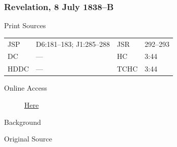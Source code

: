 		\subsubsection{Revelation, 8 July 1838--B}
			\label{EMS-1838-JS-8-JUL-1838-B}
			
			\begin{description}
					\item[Print Sources]
				\end{description}

					\begin{tabular}{p{0.5in}p{1in}p{0.5in}p{1in}}
					JSP	 	& D6:181--183; J1:285--288		& JSR 		& 292--293 \\
					DC	 	& ---		& HC 		& 3:44 \\
					HDDC 	& ---		& TCHC 		& 3:44 \\
					\end{tabular}
				
				\begin{description}
					\item[Online Access] \href{https://www.josephsmithpapers.org/paper-summary/revelation-8-july-1838-b/1}{Here}
				\end{description}
				
				\begin{description}
					\item[Background]
				\end{description}
				
				
				\begin{description}
					\item[Original Source]
				\end{description}
				
				
